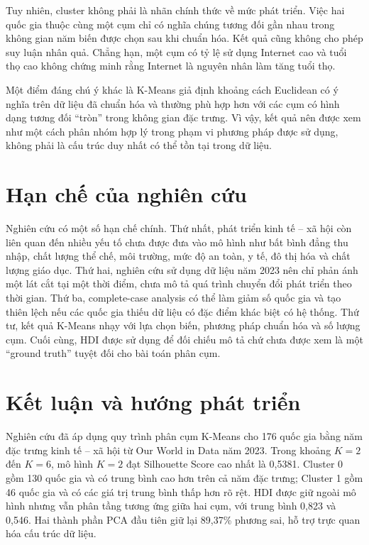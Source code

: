\documentclass[11pt,a4paper]{article}
\begin{document}
Tuy nhiên, cluster không phải là nhãn chính thức về mức phát triển. Việc hai quốc gia thuộc cùng một cụm chỉ có nghĩa chúng tương đối gần nhau trong không gian năm biến được chọn sau khi chuẩn hóa. Kết quả cũng không cho phép suy luận nhân quả. Chẳng hạn, một cụm có tỷ lệ sử dụng Internet cao và tuổi thọ cao không chứng minh rằng Internet là nguyên nhân làm tăng tuổi thọ.

Một điểm đáng chú ý khác là K-Means giả định khoảng cách Euclidean có ý nghĩa trên dữ liệu đã chuẩn hóa và thường phù hợp hơn với các cụm có hình dạng tương đối ``tròn'' trong không gian đặc trưng. Vì vậy, kết quả nên được xem như một cách phân nhóm hợp lý trong phạm vi phương pháp được sử dụng, không phải là cấu trúc duy nhất có thể tồn tại trong dữ liệu.

\section{Hạn chế của nghiên cứu}

Nghiên cứu có một số hạn chế chính. Thứ nhất, phát triển kinh tế -- xã hội còn liên quan đến nhiều yếu tố chưa được đưa vào mô hình như bất bình đẳng thu nhập, chất lượng thể chế, môi trường, mức độ an toàn, y tế, đô thị hóa và chất lượng giáo dục. Thứ hai, nghiên cứu sử dụng dữ liệu năm 2023 nên chỉ phản ánh một lát cắt tại một thời điểm, chưa mô tả quá trình chuyển đổi phát triển theo thời gian. Thứ ba, complete-case analysis có thể làm giảm số quốc gia và tạo thiên lệch nếu các quốc gia thiếu dữ liệu có đặc điểm khác biệt có hệ thống. Thứ tư, kết quả K-Means nhạy với lựa chọn biến, phương pháp chuẩn hóa và số lượng cụm. Cuối cùng, HDI được sử dụng để đối chiếu mô tả chứ chưa được xem là một ``ground truth'' tuyệt đối cho bài toán phân cụm.

\section{Kết luận và hướng phát triển}

Nghiên cứu đã áp dụng quy trình phân cụm K-Means cho 176 quốc gia bằng năm đặc trưng kinh tế -- xã hội từ Our World in Data năm 2023. Trong khoảng $K=2$ đến $K=6$, mô hình $K=2$ đạt Silhouette Score cao nhất là 0,5381. Cluster 0 gồm 130 quốc gia và có trung bình cao hơn trên cả năm đặc trưng; Cluster 1 gồm 46 quốc gia và có các giá trị trung bình thấp hơn rõ rệt. HDI được giữ ngoài mô hình nhưng vẫn phân tầng tương ứng giữa hai cụm, với trung bình 0,823 và 0,546. Hai thành phần PCA đầu tiên giữ lại 89,37\% phương sai, hỗ trợ trực quan hóa cấu trúc dữ liệu.
\end{document}
